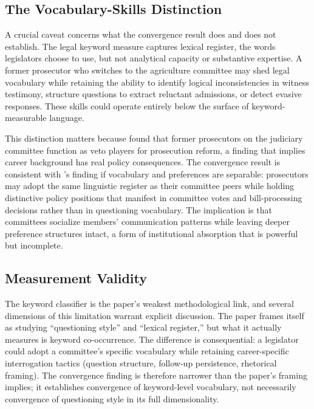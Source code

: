 \documentclass[11pt]{article}
\begin{document}
\subsection{The Vocabulary-Skills Distinction}

A crucial caveat concerns what the convergence result does and does not establish. The legal keyword measure captures lexical register, the words legislators choose to use, but not analytical capacity or substantive expertise. A former prosecutor who switches to the agriculture committee may shed legal vocabulary while retaining the ability to identify logical inconsistencies in witness testimony, structure questions to extract reluctant admissions, or detect evasive responses. These skills could operate entirely below the surface of keyword-measurable language.

This distinction matters because \citet{park2025} found that former prosecutors on the judiciary committee function as veto players for prosecution reform, a finding that implies career background has real policy consequences. The convergence result is consistent with \citeauthor{park2025}'s finding if vocabulary and preferences are separable: prosecutors may adopt the same linguistic register as their committee peers while holding distinctive policy positions that manifest in committee votes and bill-processing decisions rather than in questioning vocabulary. The implication is that committees socialize members' communication patterns while leaving deeper preference structures intact, a form of institutional absorption that is powerful but incomplete.

\subsection{Measurement Validity}

The keyword classifier is the paper's weakest methodological link, and several dimensions of this limitation warrant explicit discussion. The paper frames itself as studying ``questioning style'' and ``lexical register,'' but what it actually measures is keyword co-occurrence. The difference is consequential: a legislator could adopt a committee's specific vocabulary while retaining career-specific interrogation tactics (question structure, follow-up persistence, rhetorical framing). The convergence finding is therefore narrower than the paper's framing implies; it establishes convergence of keyword-level vocabulary, not necessarily convergence of questioning style in its full dimensionality.
\end{document}

